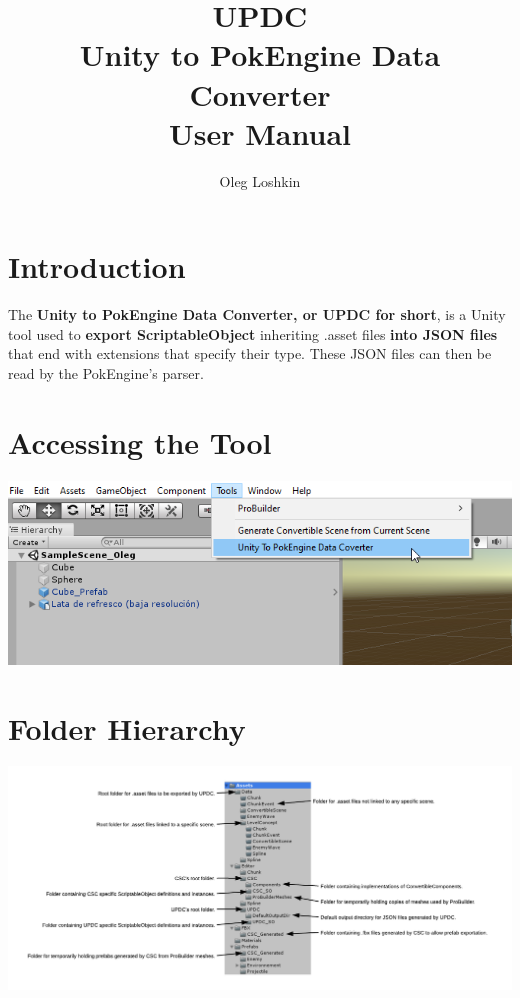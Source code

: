 \documentclass[10pt,a4paper]{article}
\author{Oleg Loshkin}
\title{\textbf{UPDC}\\Unity to PokEngine Data Converter\\\textbf{User Manual}}
\begin{document}
\maketitle
\section{Introduction}
The \textbf{Unity to PokEngine Data Converter, or UPDC for short}, is a Unity tool used to \textbf{export ScriptableObject} inheriting .asset files \textbf{into JSON files} that end with extensions that specify their type. These JSON files can then be read by the PokEngine's parser.

\section{Accessing the Tool}
\begin{center}
\includegraphics[scale=1.0]{mainMenu}
\end{center}

\section{Folder Hierarchy}
\begin{center}
\includegraphics[scale=0.425]{folderUPDC}
\end{center}
\end{document}
